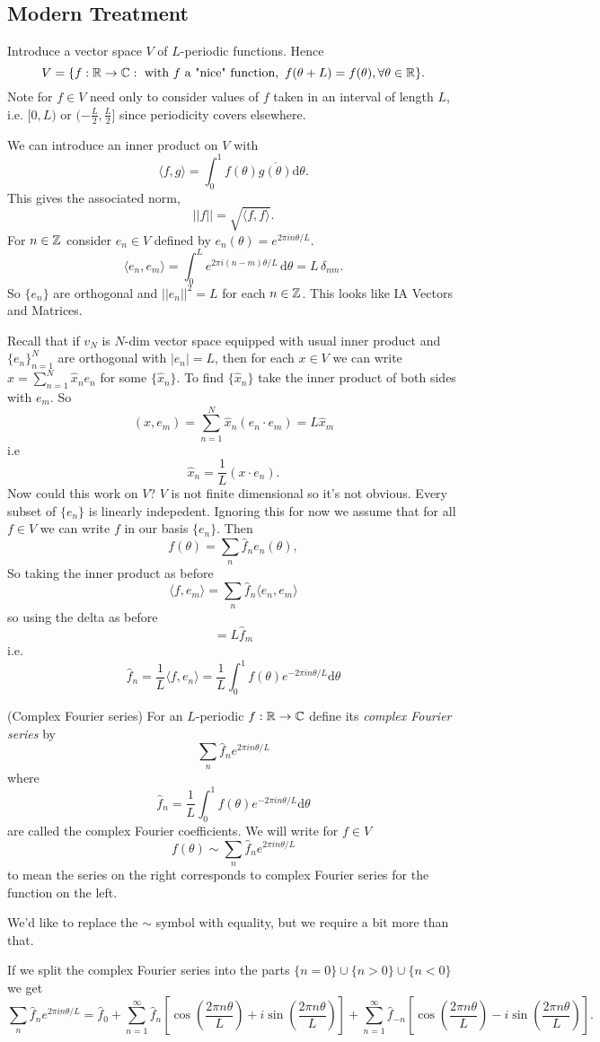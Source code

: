 \documentclass{article}
\begin{document}
\subsection{Modern Treatment}
Introduce a vector space $ V $ of $ L $-periodic functions. Hence
\[
	V=\{f:\mathbb{R}\to\mathbb{C}:\text{ with } f \text{ a "nice" function},\text { } f(\theta+L)=f(\theta), \forall \theta\in\mathbb{R}\}.
\]
Note for $ f\in V $ need only to consider values of $ f $ taken in an interval of length $ L $, i.e. $ [0,L) $ or $ (-\frac L2,\frac L2] $ since periodicity covers elsewhere.\par
We can introduce an inner product on $ V $ with
\[
	\langle f,g\rangle=\int_0^1f(\theta)\overline{g(\theta)}\mathrm d\theta.
\]
This gives the associated norm,
\[
	||f||=\sqrt{\langle f,f\rangle}.
\]
For $ n\in \mathbb{Z} $ consider $ e_n\in V $ defined by $ e_n(\theta)=e^{2\pi i n\theta / L }$.
\[
\langle e_n,e_m\rangle = \int_0^L e^{2\pi i (n-m)\theta / L}\,\mathrm d\theta = L\,\delta_{nm}.
\]
So $ \{e_n\} $ are orthogonal and $ ||e_n||^2=L $ for each $ n\in \mathbb{Z} $. This looks like IA Vectors and Matrices.\par
Recall that if $ v_N $ is $ N $-dim vector space equipped with usual inner product and $ \{ e_n\}^N_{n=1} $ are orthogonal with $ | e_n|=L $, then for each $  x\in V $ we can write $  x = \sum_{n=1}^N \hat{x}_n{e_n} $ for some $ \{\hat {x}_n\} $. To find $ \{\hat{x}_n\} $ take the inner product of both sides with $  e_m $. So
\[
	( x,  e_m)=\sum_{n=1}^N \hat{x}_n( e_n\cdot  e_m)=L\hat{x}_m
\]
i.e
\[
\hat x_n = \frac 1L( x\cdot  e_n).
\]
Now could this work on $ V $? $ V $ is not finite dimensional so it's not obvious. Every subset of $ \{e_n\} $ is linearly indepedent. Ignoring this for now we assume that for all $ f\in V $ we can write $ f $ in our basis $ \{e_n\} $. Then
\[
  f(\theta)=\sum_n\hat f_ne_n(\theta),
\]
So taking the inner product as before
\[
  \langle f,e_m\rangle = \sum_n\hat f_n\langle e_n,e_m\rangle
\]
so using the delta as before
\[
  =L\hat f_m
\]
i.e.
\[
	\hat f_n=\frac{1}{L}\langle f, e_n\rangle = \frac{1}{L} \int_0^1 f(\theta)e^{-2\pi in\theta/L}\mathrm d\theta
\]
\begin{definition}
	(Complex Fourier series) For an $ L $-periodic $ f:\mathbb{R}\to \mathbb{C} $ define its \textit{complex Fourier series} by
	\[
		\sum_n\hat f_n e^{2\pi in \theta /L}
	\]
	where
	\[
		\hat f_n = \frac 1L \int_0^1 f(\theta) e^{-2\pi in\theta/L}\mathrm d \theta
	\]
	are called the complex Fourier coefficients. We will write for $ f\in V $
	\[
		f(\theta)\sim \sum_n\hat f_n e^{2\pi in\theta/L}
	\]
	to mean the series on the right corresponds to complex Fourier series for the function on the left.
\end{definition}
We'd like to replace the $ \sim $ symbol with equality, but we require a bit more than that.\par
If we split the complex Fourier series into the parts $\{n=0\}\cup\{n>0\}\cup\{n<0\}$ we get
\[
\sum_n\hat f_n e^{2\pi i n\theta / L} = \hat f_0 + \sum_{n=1}^\infty \hat f_n\left[\cos\left(\frac{2\pi n\theta}{L}\right)+i\sin\left(\frac{2\pi n\theta}{L}\right)\right]
+
\sum_{n=1}^\infty \hat f_{-n}\left[\cos\left(\frac{2\pi n\theta}{L}\right)-i\sin\left(\frac{2\pi n\theta}{L}\right)\right].
\]
\end{document}
